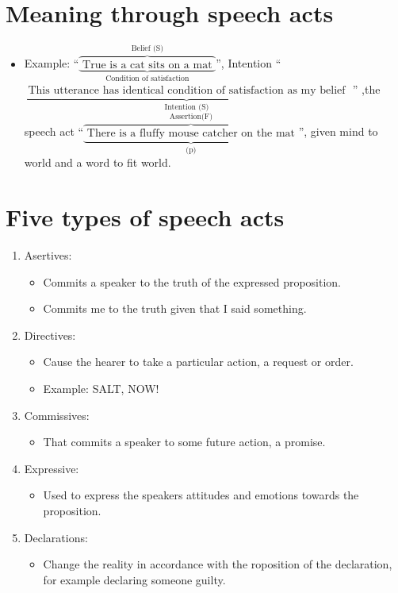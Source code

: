 \section{Meaning through speech acts}
\begin{itemize}
    \item Example: ``$\overbrace{\underbrace{\text{ True is a cat sits on a mat }}_{\text{ Condition of satisfaction }}}^{\text{ Belief (S) }}$'', Intention ``$\underbrace{\text{ This utterance has identical condition of satisfaction as my belief  }}_{\text{ Intention (S) }}$ '' ,the speech act ``$\overbrace{\underbrace{\text{ There is a fluffy mouse catcher on the mat }}_{\text{ (p) }}}^{\text{ Assertion(F) }}$'', given mind to world and a word to fit world.
\end{itemize}



\section{Five types of speech acts}
\begin{enumerate}
    \item Asertives:
        \begin{itemize}
            \item Commits a speaker to the truth of the expressed proposition. 
            \item Commits me to the truth given that I said something.
        \end{itemize}
    
    \item Directives:
        \begin{itemize}
            \item Cause the hearer to take a particular action, a request or order.
            \item Example: SALT, NOW! 
        \end{itemize}
    
    \item Commissives:
        \begin{itemize}
            \item That commits a speaker to some future action, a promise.
        \end{itemize}
    
    \item Expressive:
        \begin{itemize}
            \item Used to express the speakers attitudes and emotions towards the proposition.
        \end{itemize}
    
    \item Declarations:
        \begin{itemize}
            \item Change the reality in accordance with the roposition of the declaration, for example declaring someone guilty.
        \end{itemize}
        
\end{enumerate}

